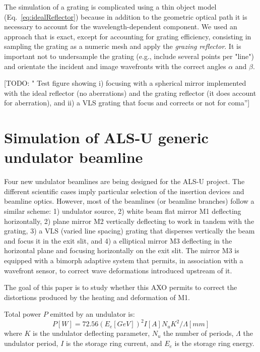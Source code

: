 \documentclass{iucr}              %
\newcommand{\todo}[1]{{\color{red}[TODO: "#1'']}}
\begin{document}
The simulation of a grating is complicated using a thin object model (Eq.~\ref{eq:idealReflector}) because in addition to the geometric optical path it is necessary to account for the wavelength-dependent component. We used an approach that is exact, except for accounting for grating efficiency, consisting in sampling the grating as a numeric mesh and apply the {\it grazing reflector}. It is important not to undersample the grating (e.g., include several points per "line") and orientate the incident and image wavefronts with the correct angles $\alpha$ and $\beta$.      

\todo{  Test figure showing i) focusing with a spherical mirror implemented with the ideal reflector (no aberrations) and the grating reflector (it does account for aberration), and ii) a VLS grating that focus and corrects or not for coma}


\section{Simulation of ALS-U generic undulator beamline}

Four new undulator beamlines are being designed for the ALS-U project. The different scientific cases imply particular selection of the insertion devices and beamline optics. However, most of the beamlines (or beamline branches) follow a similar scheme: 1) undulator source, 2) white beam flat mirror M1 deflecting horizontally, 2) plane mirror M2 vertically deflecting to work in tandem with the grating, 3) a VLS (varied line spacing) grating that disperses vertically the beam and focus it in the exit slit, and 4) a elliptical mirror M3 deflecting in the horizontal plane and focusing horizontally on the exit slit. The mirror M3 is equipped with a bimorph adaptive system that permits, in association with a wavefront sensor, to correct wave deformations introduced upstream of it.

The goal of this paper is to study whether this AXO permits to correct the distortions produced by the heating and deformation of M1.

Total power $P$ emitted by an undulator is: 
\begin{equation}
    P [W] = 72.56  (E_e [GeV])^2  I[A]  N_u  K^2 / \Lambda[mm]
\end{equation}
where $K$ is the undulator deflecting parameter, $N_u$ the number of periods, $\Lambda$ the undulator period, $I$ is the storage ring current, and $E_e$ is the storage ring energy. 
\end{document}
